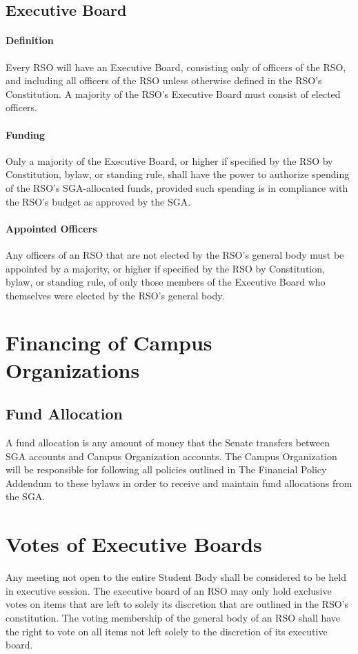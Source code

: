 \documentclass[12pt]{scrreprt}
\begin{document}
\subsection{Executive Board}

\paragraph{Definition}
Every RSO will have an Executive Board, consisting only of officers of
the RSO, and including all officers of the RSO unless otherwise
defined in the RSO’s Constitution. A majority of the RSO’s Executive
Board must consist of elected officers.

\paragraph{Funding}
Only a majority of the Executive Board, or higher if specified by the
RSO by Constitution, bylaw, or standing rule, shall have the power to
authorize spending of the RSO’s SGA-allocated funds, provided such
spending is in compliance with the RSO’s budget as approved by the
SGA.

\paragraph{Appointed Officers}
Any officers of an RSO that are not elected by the RSO’s general body
must be appointed by a majority, or higher if specified by the RSO by
Constitution, bylaw, or standing rule, of only those members of the
Executive Board who themselves were elected by the RSO’s general body.

\section{Financing of Campus Organizations}

\subsection{Fund Allocation}
A fund allocation is any amount of money that the Senate transfers between SGA accounts and Campus Organization accounts. The Campus Organization will be responsible for following all policies outlined in The Financial Policy Addendum to these bylaws in order to receive and maintain fund allocations from the SGA.

\section{Votes of Executive Boards}
Any meeting not open to the entire Student Body shall be considered to be held 
in executive session. The executive board of an RSO may only hold exclusive votes on items that are left to solely its discretion that are outlined in the RSO’s constitution. The voting membership of the general body of an RSO shall have the right to vote on all items not left solely to the discretion of its executive board.
\end{document}
